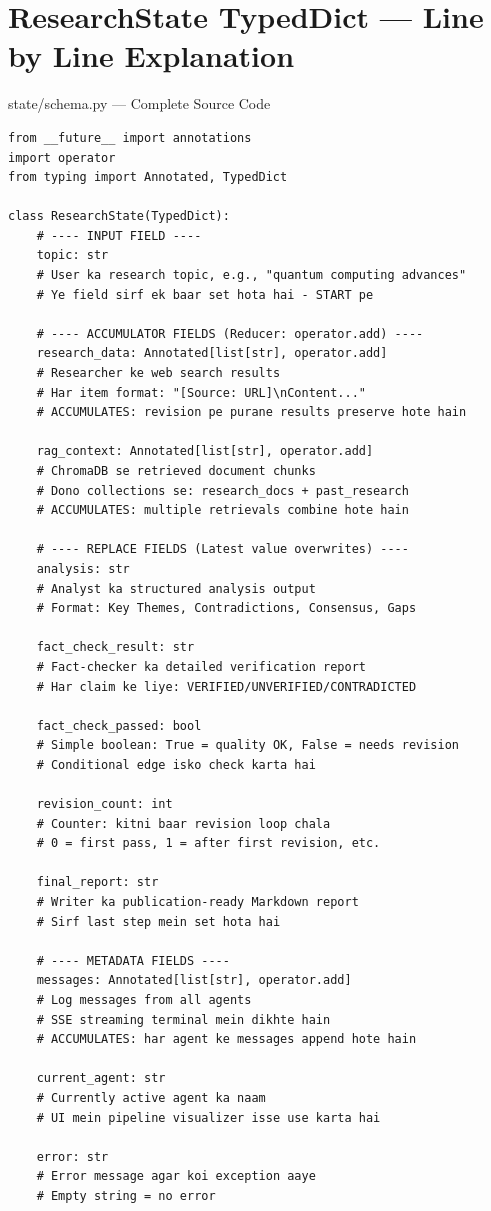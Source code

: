\documentclass[11pt,a4paper,twoside]{report}
\begin{document}
\section{ResearchState TypedDict --- Line by Line Explanation}

\begin{codewalkbox}{state/schema.py --- Complete Source Code}
\begin{lstlisting}[style=pythonstyle]
from __future__ import annotations
import operator
from typing import Annotated, TypedDict

class ResearchState(TypedDict):
    # ---- INPUT FIELD ----
    topic: str
    # User ka research topic, e.g., "quantum computing advances"
    # Ye field sirf ek baar set hota hai - START pe

    # ---- ACCUMULATOR FIELDS (Reducer: operator.add) ----
    research_data: Annotated[list[str], operator.add]
    # Researcher ke web search results
    # Har item format: "[Source: URL]\nContent..."
    # ACCUMULATES: revision pe purane results preserve hote hain

    rag_context: Annotated[list[str], operator.add]
    # ChromaDB se retrieved document chunks
    # Dono collections se: research_docs + past_research
    # ACCUMULATES: multiple retrievals combine hote hain

    # ---- REPLACE FIELDS (Latest value overwrites) ----
    analysis: str
    # Analyst ka structured analysis output
    # Format: Key Themes, Contradictions, Consensus, Gaps

    fact_check_result: str
    # Fact-checker ka detailed verification report
    # Har claim ke liye: VERIFIED/UNVERIFIED/CONTRADICTED

    fact_check_passed: bool
    # Simple boolean: True = quality OK, False = needs revision
    # Conditional edge isko check karta hai

    revision_count: int
    # Counter: kitni baar revision loop chala
    # 0 = first pass, 1 = after first revision, etc.

    final_report: str
    # Writer ka publication-ready Markdown report
    # Sirf last step mein set hota hai

    # ---- METADATA FIELDS ----
    messages: Annotated[list[str], operator.add]
    # Log messages from all agents
    # SSE streaming terminal mein dikhte hain
    # ACCUMULATES: har agent ke messages append hote hain

    current_agent: str
    # Currently active agent ka naam
    # UI mein pipeline visualizer isse use karta hai

    error: str
    # Error message agar koi exception aaye
    # Empty string = no error
\end{lstlisting}
\end{codewalkbox}
\end{document}
